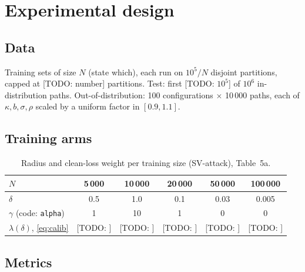 \documentclass[11pt]{article}
\newif\ifshowguides
\newcommand{\guide}[1]{\ifshowguides
  \par\smallskip\noindent\fcolorbox{gray!50}{gray!6}{\parbox{\dimexpr\linewidth-2\fboxsep-2\fboxrule}{\small\itshape\color{gray!80!black}#1}}\par\smallskip\fi}
\newcommand{\todo}[1]{\textcolor{red!70!black}{[TODO: #1]}}
\newcommand{\cvar}{\mathrm{CVaR}}
\begin{document}
\section{Experimental design}\label{sec:experiments}
\subsection{Data}
Training sets of size $N$ (state which), each run on $10^5/N$ disjoint partitions, capped at
\todo{number} partitions. Test: first \todo{$10^5$} of $10^6$ in-distribution paths.
Out-of-distribution: 100 configurations $\times$ 10\,000 paths, each of $\kappa,b,\sigma,\rho$
scaled by a uniform factor in $[0.9,1.1]$.

\subsection{Training arms}
\guide{(i) Clean, matched control: authors' adversarial script with $\delta=0$ (same learning
rate and schedule as the robust arms; the authors' clean script uses a different learning rate,
0.05 vs.\ 0.005 --- report this). (ii) Constrained, $\delta$ from \cref{tab:hyper}. (iii)
Penalized, $\lambda$ calibrated by \eqref{eq:calib}, same $\gamma$. Then sweeps of $\delta$ and
$\lambda$ at one $N$. Same epochs (300 clean + 400 robust), optimiser, partitions for all.}

\begin{table}[htbp]\centering
\caption{Radius and clean-loss weight per training size (SV-attack), \cite{he2025} Table~5a.}\label{tab:hyper}
\begin{tabular}{lccccc}\toprule
$N$ & 5\,000 & 10\,000 & 20\,000 & 50\,000 & 100\,000\\\midrule
$\delta$ & 0.5 & 1.0 & 0.1 & 0.03 & 0.005\\
$\gamma$ (code: \texttt{alpha}) & 1 & 10 & 1 & 0 & 0\\
$\lambda(\delta)$, \eqref{eq:calib} & \todo{} & \todo{} & \todo{} & \todo{} & \todo{}\\\bottomrule
\end{tabular}
\end{table}

\subsection{Metrics}
\guide{(i) In-distribution $\cvar_{0.5}$; (ii) out-of-distribution $\cvar_{0.5}$, mean and worst
over the 100 configurations; (iii) $\cvar_{0.5}$ under the constrained attack at $\delta$ and under
the penalized attack at $\lambda$ (every model faces both); (iv) realised radius of each attack;
(v) training time (context only). Mean $\pm$ std over partitions.}
\end{document}

